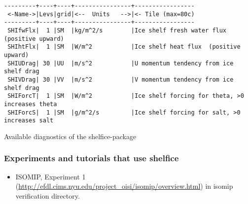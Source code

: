 \begin{table}[h!]
\centering
\label{tab:pkg:shelfice:diagnostics}
{\footnotesize
\begin{verbatim}
---------+----+----+----------------+-----------------
 <-Name->|Levs|grid|<--  Units   -->|<- Tile (max=80c)
---------+----+----+----------------+-----------------
 SHIfwFlx|  1 |SM  |kg/m^2/s        |Ice shelf fresh water flux (positive upward)
 SHIhtFlx|  1 |SM  |W/m^2           |Ice shelf heat flux  (positive upward)
 SHIUDrag| 30 |UU  |m/s^2           |U momentum tendency from ice shelf drag
 SHIVDrag| 30 |VV  |m/s^2           |V momentum tendency from ice shelf drag
 SHIForcT|  1 |SM  |W/m^2           |Ice shelf forcing for theta, >0 increases theta
 SHIForcS|  1 |SM  |g/m^2/s         |Ice shelf forcing for salt, >0 increases salt
\end{verbatim}
}
\caption{Available diagnostics of the shelfice-package}
\end{table}



\subsubsection{Experiments and tutorials that use shelfice}
\label{sec:pkg:shelfice:experiments}

\begin{itemize}
\item{ISOMIP, Experiment 1
    (\url{http://efdl.cims.nyu.edu/project_oisi/isomip/overview.html})
    in isomip verification directory.}
\end{itemize}


